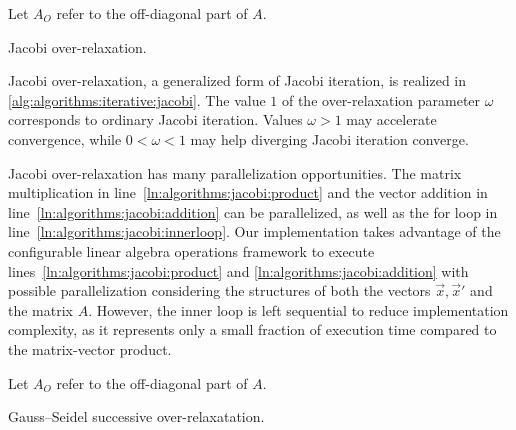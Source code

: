 \begin{algorithm}
  \;
  Let $A_O$ refer to the off-diagonal part of $A$.\;
  \;
  \caption{Jacobi over-relaxation.}
  \label{alg:algorithms:iterative:jacobi}
\end{algorithm}

Jacobi over-relaxation, a generalized form of Jacobi iteration, is
realized in \vref{alg:algorithms:iterative:jacobi}. The value $1$ of
the over-relaxation parameter $\omega$ corresponds to ordinary Jacobi
iteration. Values $\omega > 1$ may accelerate convergence, while
$0 < \omega < 1$ may help diverging Jacobi iteration converge.

Jacobi over-relaxation has many parallelization opportunities. The
matrix multiplication in line~\ref{ln:algorithms:jacobi:product} and
the vector addition in line~\ref{ln:algorithms:jacobi:addition} can be
parallelized, as well as the for loop in
line~\ref{ln:algorithms:jacobi:innerloop}. Our implementation takes
advantage of the configurable linear algebra operations framework to
execute lines~\ref{ln:algorithms:jacobi:product} and
\ref{ln:algorithms:jacobi:addition} with possible parallelization
considering the structures of both the vectors $\vec{x}, \vec{x}'$ and
the matrix $A$. However, the inner loop is left sequential to reduce
implementation complexity, as it represents only a small fraction of
execution time compared to the matrix-vector product.

\begin{algorithm}
  \;
  Let $A_O$ refer to the off-diagonal part of $A$.\;
  \;
  \caption{Gauss--Seidel successive over-relaxatation.}
  \label{alg:algorithms:iterative:gs}
\end{algorithm}

